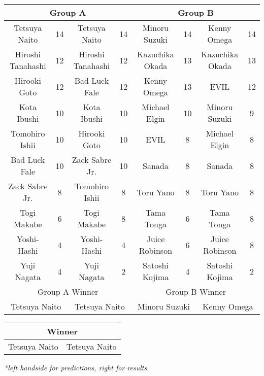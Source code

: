 \documentclass[landscape]{article}
\begin{document}
\vspace{10pt}
\begin{tabular}{|c|c|c|c|c|c|c|c|}
  \hline
  \multicolumn{4}{|c|}{\cellcolor{red} Group A} & \multicolumn{4}{|c|}{\cellcolor{blue} Group B} \\
  \hline
  Tetsuya Naito & 14 & Tetsuya Naito & 14 & Minoru Suzuki & 14 & Kenny Omega & 14 \\
  \hline
  Hiroshi Tanahashi & 12 & Hiroshi Tanahashi & 12 & Kazuchika Okada & 13 & Kazuchika Okada & 13 \\
  \hline
  Hirooki Goto & 12 & Bad Luck Fale & 12 & Kenny Omega & 13 & EVIL & 12 \\
  \hline
  Kota Ibushi & 10 & Kota Ibushi & 10 & Michael Elgin & 10 & Minoru Suzuki & 9 \\
  \hline
  Tomohiro Ishii & 10 & Hirooki Goto & 10 & EVIL & 8 & Michael Elgin & 8 \\
  \hline
  Bad Luck Fale & 10 & Zack Sabre Jr. & 10 & Sanada & 8 & Sanada & 8 \\
  \hline
  Zack Sabre Jr. & 8 & Tomohiro Ishii & 8 & Toru Yano & 8 & Toru Yano & 8 \\
  \hline
  Togi Makabe & 6 & Togi Makabe & 8 & Tama Tonga & 6 & Tama Tonga & 8 \\
  \hline
  Yoshi-Hashi & 4 & Yoshi-Hashi & 4 & Juice Robinson & 6 & Juice Robinson & 8 \\
  \hline
  Yuji Nagata & 4 & Yuji Nagata & 2 & Satoshi Kojima & 4 & Satoshi Kojima & 2 \\
  \hline\hline
  \multicolumn{4}{|c|}{\cellcolor{magenta} Group A Winner} &  \multicolumn{4}{|c|}{\cellcolor{cyan} Group B Winner} \\
  \hline
  \multicolumn{2}{|c|}{Tetsuya Naito} & \multicolumn{2}{|c|}{Tetsuya Naito} & \multicolumn{2}{|c|}{Minoru Suzuki} & \multicolumn{2}{|c|}{Kenny Omega} \\
  \hline
\end{tabular}

\vspace{10pt}
\begin{tabular}{|c|c|}
  \hline
  \multicolumn{2}{|c|}{\cellcolor{orange} Winner} \\
  \hline
  Tetsuya Naito & Tetsuya Naito \\
  \hline
\end{tabular}

\vspace{10pt}
\textit{*left handside for predictions, right for results}
\end{document}
